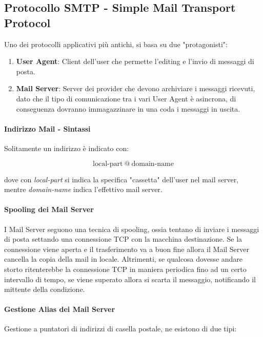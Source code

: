 \documentclass{article}
\begin{document}
\newpage

\subsection{Protocollo SMTP - Simple Mail Transport Protocol}

Uno dei protocolli applicativi più antichi, si basa su due "protagonisti":

\begin{enumerate}
    \item \textbf{User Agent}: Client dell'user che permette l'editing e l'invio di messaggi di posta.
    \item \textbf{Mail Server}: Server dei provider che devono archiviare i messaggi ricevuti, dato che il tipo di comunicazione tra i vari User Agent è asincrona, di conseguenza dovranno immagazzinare in una coda i messaggi in uscita.
\end{enumerate}

\paragraph{Indirizzo Mail - Sintassi} Solitamente un indirizzo è indicato con:

\[ \boxed{\text{local-part} \: @ \: \text{domain-name}} \]

\vspace*{5px}

dove con \textit{local-part} si indica la specifica "cassetta" dell'user nel mail server, mentre
\textit{domain-name} indica l'effettivo mail server.

\paragraph{Spooling dei Mail Server} I Mail Server seguono una tecnica di spooling, ossia tentano di inviare i messaggi di posta settando una connessione TCP con la macchina destinazione. Se la connessione viene aperta e il trasferimento va a buon fine allora
il Mail Server cancella la copia della mail in locale. Altrimenti, se qualcosa dovesse andare storto ritenterebbe la connessione TCP in maniera periodica fino ad un certo intervallo di tempo, se viene superato allora si scarta il messaggio, notificando il mittente della condizione.

\paragraph{Gestione Alias dei Mail Server} Gestione a puntatori di indirizzi di casella postale, ne esistono di due tipi:
\end{document}
